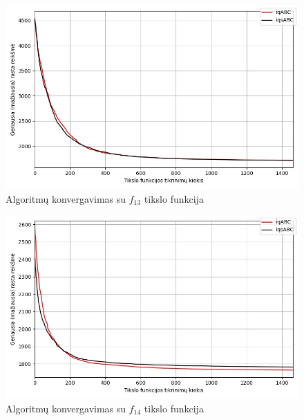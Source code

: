 \documentclass{VUMIFPSmagistrinis}
\begin{document}
\begin{landscape}
\begin{multicols}{2}
\begin{figure}[H]
    \centering
    \includegraphics[scale=0.5]{img/2kg/f13.jpg}
    \caption{Algoritmų konvergavimas su $f_{13}$ tikslo funkcija}
    \label{img:vkonf13}
\end{figure}

\begin{figure}[H]
    \centering
    \includegraphics[scale=0.5]{img/2kg/f14.jpg}
    \caption{Algoritmų konvergavimas su $f_{14}$ tikslo funkcija}
    \label{img:vkonf14}
\end{figure}


\end{multicols}



\end{landscape}
\end{document}
